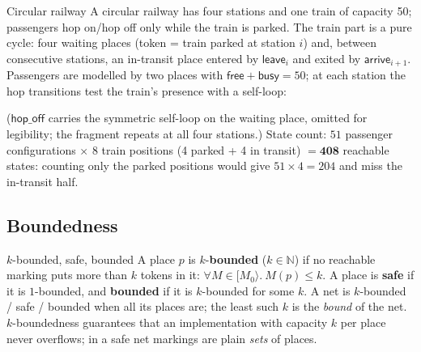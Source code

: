 \begin{examplebox}{Circular railway}
A circular railway has four stations and one train of capacity 50; passengers \textsf{hop on}/\textsf{hop off} only while the train is parked. The train part is a pure cycle: four \textsf{waiting} places (token = train parked at station $i$) and, between consecutive stations, an in-transit place entered by $\textsf{leave}_i$ and exited by $\textsf{arrive}_{i+1}$. Passengers are modelled by two places with $\textsf{free} + \textsf{busy} = 50$; at each station the hop transitions test the train's presence with a self-loop:
\begin{center}
\end{center}
($\textsf{hop\_off}$ carries the symmetric self-loop on the waiting place, omitted for legibility; the fragment repeats at all four stations.) State count: $51$ passenger configurations $\times$ $8$ train positions (4 parked + 4 in transit) $= \mathbf{408}$ reachable states: counting only the parked positions would give $51 \times 4 = 204$ and miss the in-transit half.
\end{examplebox}

\subsection{Boundedness}

\begin{definitionbox}{$k$-bounded, safe, bounded}
A place $p$ is $k$-\textbf{bounded} ($k \in \mathbb{N}$) if no reachable marking puts more than $k$ tokens in it: $\forall M \in [M_0\rangle.\ M(p) \leq k$. A place is \textbf{safe} if it is $1$-bounded, and \textbf{bounded} if it is $k$-bounded for some $k$. A net is $k$-bounded / safe / bounded when all its places are; the least such $k$ is the \emph{bound} of the net. $k$-boundedness guarantees that an implementation with capacity $k$ per place never overflows; in a safe net markings are plain \emph{sets} of places.
\end{definitionbox}

